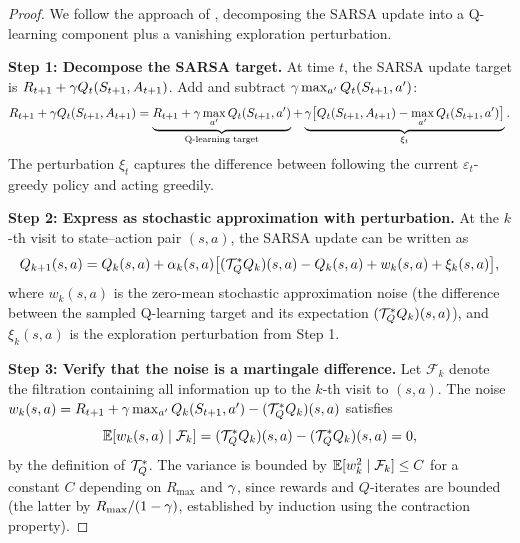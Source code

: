 \documentclass[11pt,a4paper]{article}
\begin{document}
\begin{proof}
We follow the approach of \citet{singh2000}, decomposing the SARSA
update into a Q-learning component plus a vanishing exploration
perturbation.

\textbf{Step 1: Decompose the SARSA target.}
At time $t$, the SARSA update target is
$R_{t+1} + \gamma Q_t(S_{t+1}, A_{t+1})$. Add and subtract
$\gamma \max_{a'} Q_t(S_{t+1}, a')$:
\begin{equation}
  R_{t+1} + \gamma Q_t(S_{t+1}, A_{t+1})
  = \underbrace{R_{t+1} + \gamma \max_{a'} Q_t(S_{t+1}, a')}
    _{\text{Q-learning target}}
  + \underbrace{\gamma\bigl[Q_t(S_{t+1}, A_{t+1})
    - \max_{a'} Q_t(S_{t+1}, a')\bigr]}_{\xi_t}.
  \label{eq:sarsa_decomp}
\end{equation}
The perturbation $\xi_t$ captures the difference between following
the current $\varepsilon_t$-greedy policy and acting greedily.

\textbf{Step 2: Express as stochastic approximation with perturbation.}
At the $k$-th visit to state--action pair $(s,a)$, the SARSA update
can be written as
\begin{equation}
  Q_{k+1}(s,a) = Q_k(s,a)
  + \alpha_k(s,a)\bigl[(\mathcal{T}^*_Q Q_k)(s,a) - Q_k(s,a)
  + w_k(s,a) + \xi_k(s,a)\bigr],
  \label{eq:sarsa_sa}
\end{equation}
where $w_k(s,a)$ is the zero-mean stochastic approximation noise
(the difference between the sampled Q-learning target and its
expectation $(\mathcal{T}^*_Q Q_k)(s,a)$), and $\xi_k(s,a)$ is the
exploration perturbation from Step 1.

\textbf{Step 3: Verify that the noise is a martingale difference.}
Let $\mathcal{F}_k$ denote the filtration containing all information
up to the $k$-th visit to $(s,a)$. The noise
$w_k(s,a) = R_{t+1} + \gamma \max_{a'} Q_k(S_{t+1}, a')
- (\mathcal{T}^*_Q Q_k)(s,a)$ satisfies
\begin{equation}
  \mathbb{E}[w_k(s,a) \mid \mathcal{F}_k]
  = (\mathcal{T}^*_Q Q_k)(s,a) - (\mathcal{T}^*_Q Q_k)(s,a) = 0,
  \label{eq:noise_mg}
\end{equation}
by the definition of $\mathcal{T}^*_Q$. The variance is bounded by
$\mathbb{E}[w_k^2 \mid \mathcal{F}_k] \leq C$ for a constant $C$ depending
on $R_{\max}$ and $\gamma$, since rewards and $Q$-iterates
are bounded (the latter by $R_{\max}/(1-\gamma)$, established
by induction using the contraction property).


\end{proof}
\end{document}
